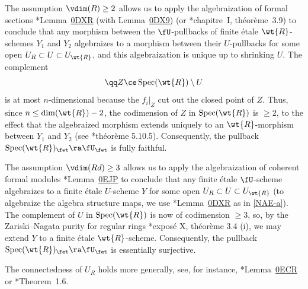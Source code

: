 \benum
\item
The assumption $\vdim(R) \ge 2$ allows us to apply the algebraization of formal sections \cite{SP}*{Lemma~\href{https://stacks.math.columbia.edu/tag/0DXR}{0DXR} (with Lemma~\href{https://stacks.math.columbia.edu/tag/0DX9}{0DX9})} %
(or \cite{Ray75}*{chapitre~I, th\'{e}or\`{e}me~3.9}) to conclude that any morphism between the $\fU$-pullbacks of finite \'{e}tale $\wt{R}$-schemes $Y_1$ and $Y_2$ algebraizes to a morphism between their $U$-pullbacks for some open $U_R \subset U \subset U_{\wt{R}}$, and this algebraization is unique up to shrinking $U$. The complement
\[
\qq Z \ce \Spec(\wt{R}) \setminus U
\]
is at most $n$-dimensional because the $f_i|_Z$ cut out the closed point of $Z$. Thus, since $n \le \dim(\wt{R}) - 2$, the codimension of $Z$ in $\Spec(\wt{R})$ is $\ge 2$, to the effect that the algebraized morphism extends uniquely to an $\wt{R}$-morphism between $Y_1$ and $Y_2$ (see \cite{EGAIV2}*{th\'{e}or\`{e}me 5.10.5}). Consequently, the pullback $\Spec(\wt{R})_\fet \ra \fU_\fet$ is fully faithful.

\item
The assumption $\vdim(Rd) \ge 3$ allows us to apply the algebraization of coherent formal modules \cite{SP}*{Lemma~\href{https://stacks.math.columbia.edu/tag/0EJP}{0EJP}} to conclude that any finite \'{e}tale $\fU$-scheme algebraizes to a finite \'{e}tale $U$-scheme $Y$ for some open $U_R \subset U \subset U_{\wt{R}}$ (to algebraize the algebra structure maps, we use \cite{SP}*{Lemma~\href{https://stacks.math.columbia.edu/tag/0DXR}{0DXR}} as in \ref{NAE-a}).
The complement of $U$ in $\Spec(\wt{R})$ is now of codimension $\ge 3$, %
so, by the Zariski--Nagata purity for regular rings \cite{SGA2new}*{expos\'{e} X, th\'{e}or\`{e}me 3.4 (i)}, we may extend $Y$ to a finite \'{e}tale $\wt{R}$-scheme. Consequently, the pullback $\Spec(\wt{R})_\fet \ra \fU_\fet$ is essentially surjective.
\qedhere
\eenum
\epf

\brem
The connectedness of $U_R$ holds more generally, see, for instance, \cite{SP}*{Lemma~\href{https://stacks.math.columbia.edu/tag/0ECR}{0ECR}} or \cite{Var09}*{Theorem~1.6}.
\erem




























